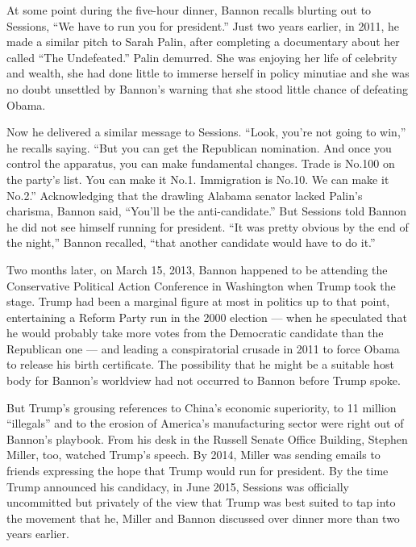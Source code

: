 At some point during the five-hour dinner, Bannon recalls blurting out
to Sessions, ``We have to run you for president.'' Just two years
earlier, in 2011, he made a similar pitch to Sarah Palin, after
completing a documentary about her called ``The Undefeated.'' Palin
demurred. She was enjoying her life of celebrity and wealth, she had
done little to immerse herself in policy minutiae and she was no doubt
unsettled by Bannon's warning that she stood little chance of defeating
Obama.

Now he delivered a similar message to Sessions. ``Look, you're not going
to win,'' he recalls saying. ``But you can get the Republican
nomination. And once you control the apparatus, you can make fundamental
changes. Trade is No.100 on the party's list. You can make it No.1.
Immigration is No.10. We can make it No.2.'' Acknowledging that the
drawling Alabama senator lacked Palin's charisma, Bannon said, ``You'll
be the anti-candidate.'' But Sessions told Bannon he did not see himself
running for president. ``It was pretty obvious by the end of the
night,'' Bannon recalled, ``that another candidate would have to do
it.''

Two months later, on March 15, 2013, Bannon happened to be attending the
Conservative Political Action Conference in Washington when Trump took
the stage. Trump had been a marginal figure at most in politics up to
that point, entertaining a Reform Party run in the 2000 election ---
when he speculated that he would probably take more votes from the
Democratic candidate than the Republican one --- and leading a
conspiratorial crusade in 2011 to force Obama to release his birth
certificate. The possibility that he might be a suitable host body for
Bannon's worldview had not occurred to Bannon before Trump spoke.

But Trump's grousing references to China's economic superiority, to 11
million ``illegals'' and to the erosion of America's manufacturing
sector were right out of Bannon's playbook. From his desk in the Russell
Senate Office Building, Stephen Miller, too, watched Trump's speech. By
2014, Miller was sending emails to friends expressing the hope that
Trump would run for president. By the time Trump announced his
candidacy, in June 2015, Sessions was officially uncommitted but
privately of the view that Trump was best suited to tap into the
movement that he, Miller and Bannon discussed over dinner more than two
years earlier.

